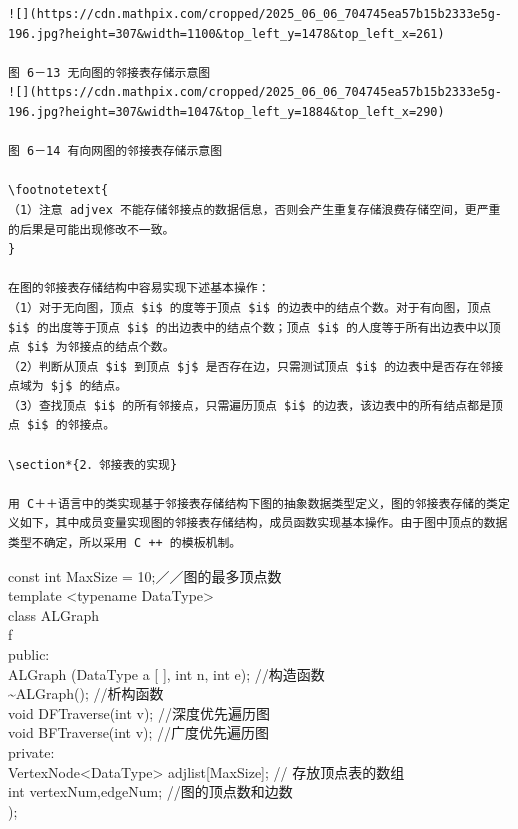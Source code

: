 \documentclass[10pt]{article}
\let\svthefootnote\thefootnote
\newcommand\blfootnotetext[1]{%
  \let\thefootnote\relax\footnote{#1}%
  \addtocounter{footnote}{-1}%
  \let\thefootnote\svthefootnote%
}
\let\svfootnotetext\footnotetext
\renewcommand\footnotetext[2][?]{%
  \if\relax#1\relax%
    \ifnum\value{footnote}=0\blfootnotetext{#2}\else\svfootnotetext{#2}\fi%
  \else%
    \if?#1\ifnum\value{footnote}=0\blfootnotetext{#2}\else\svfootnotetext{#2}\fi%
    \else\svfootnotetext[#1]{#2}\fi%
  \fi
}
\begin{document}
\begin{verbatim}
![](https://cdn.mathpix.com/cropped/2025_06_06_704745ea57b15b2333e5g-196.jpg?height=307&width=1100&top_left_y=1478&top_left_x=261)

图 6－13 无向图的邻接表存储示意图
![](https://cdn.mathpix.com/cropped/2025_06_06_704745ea57b15b2333e5g-196.jpg?height=307&width=1047&top_left_y=1884&top_left_x=290)

图 6－14 有向网图的邻接表存储示意图

\footnotetext{
（1）注意 adjvex 不能存储邻接点的数据信息，否则会产生重复存储浪费存储空间，更严重的后果是可能出现修改不一致。
}

在图的邻接表存储结构中容易实现下述基本操作：
（1）对于无向图，顶点 $i$ 的度等于顶点 $i$ 的边表中的结点个数。对于有向图，顶点 $i$ 的出度等于顶点 $i$ 的出边表中的结点个数；顶点 $i$ 的人度等于所有出边表中以顶点 $i$ 为邻接点的结点个数。
（2）判断从顶点 $i$ 到顶点 $j$ 是否存在边，只需测试顶点 $i$ 的边表中是否存在邻接点域为 $j$ 的结点。
（3）查找顶点 $i$ 的所有邻接点，只需遍历顶点 $i$ 的边表，该边表中的所有结点都是顶点 $i$ 的邻接点。

\section*{2．邻接表的实现}

用 C＋＋语言中的类实现基于邻接表存储结构下图的抽象数据类型定义，图的邻接表存储的类定义如下，其中成员变量实现图的邻接表存储结构，成员函数实现基本操作。由于图中顶点的数据类型不确定，所以采用 C ++ 的模板机制。
\end{verbatim}

const int MaxSize = 10;／／图的最多顶点数\\
template <typename DataType>\\
class ALGraph\\
f\\
public:\\[0pt]
ALGraph (DataType a [ ], int n, int e); //构造函数\\
\~{}ALGraph(); //析构函数\\
void DFTraverse(int v); //深度优先遍历图\\
void BFTraverse(int v); //广度优先遍历图\\
private:\\
VertexNode<DataType> adjlist[MaxSize]; // 存放顶点表的数组\\
int vertexNum,edgeNum; //图的顶点数和边数\\
);
\end{document}

